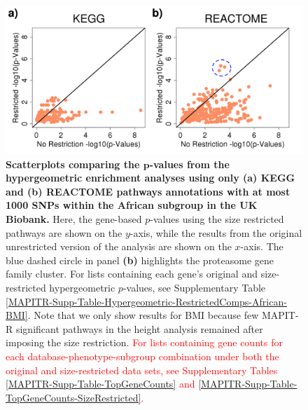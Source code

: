 \documentclass[10pt]{article}
\begin{document}
\begin{figure}[htb]
\centering
\includegraphics[width=\textwidth]{Images/Main/Figure4.png}
\caption{\textbf{Scatterplots comparing the $\bm{p}$-values from the hypergeometric enrichment analyses using only (a) KEGG and (b) REACTOME pathways annotations with at most 1000 SNPs within the African subgroup in the UK Biobank.} Here, the gene-based $p$-values using the size restricted pathways are shown on the $y$-axis, while the results from the original unrestricted version of the analysis are shown on the $x$-axis. The blue dashed circle in panel \textbf{(b)} highlights the proteasome gene family cluster. For lists containing each gene's original and size-restricted hypergeometric $p$-values, see Supplementary Table \ref{MAPITR-Supp-Table-Hypergeometric-RestrictedComps-African-BMI}. Note that we only show results for BMI because few MAPIT-R significant pathways in the height analysis remained after imposing the size restriction. \textcolor{red}{For lists containing gene counts for each database-phenotype-subgroup combination under both the original and size-restricted data sets, see Supplementary Tables \ref{MAPITR-Supp-Table-TopGeneCounts} and \ref{MAPITR-Supp-Table-TopGeneCounts-SizeRestricted}.}}
\label{MAPITR-Main-Figure-Hypergeometric-RestrictedComps-African-BMI}
\end{figure}

\end{document}
